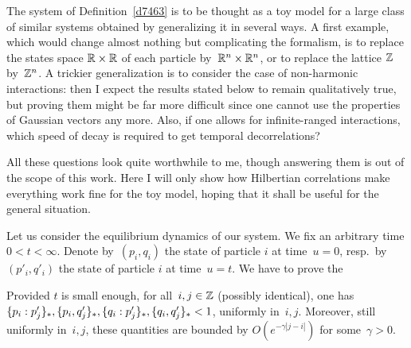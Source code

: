 \begin{Rmk}
The system of Definition~\ref{d7463} is to be thought
as a toy model for a large class of similar systems
obtained by generalizing it in several ways.
A first example, which would change almost nothing but complicating the formalism,
is to replace the states space
$\mathbb{R}\times\mathbb{R}$ of each particle by~$\mathbb{R}^n\times\mathbb{R}^n$,
or to replace the lattice $\mathbb{Z}$ by~$\mathbb{Z}^n$.
A trickier generalization is to consider the case of non-harmonic interactions:
then I expect the results stated below to remain qualitatively true,
but proving them might be far more difficult
since one cannot use the properties of Gaussian vectors any more.
Also, if one allows for infinite-ranged interactions, which speed of decay is required
to get temporal decorrelations?

All these questions look quite worthwhile to me, though answering them
is out of the scope of this work.
Here I will only show how Hilbertian correlations make everything work fine for the toy model,
hoping that it shall be useful for the general situation.
\end{Rmk}

Let us consider the equilibrium dynamics of our system.
We fix an arbitrary time $0 < t < \infty$.
Denote by~$(p_i,q_i)$ the state of particle $i$ at time~${u=0}$,
resp.\ by~$(p'_i,q'_i)$ the state of particle $i$ at time~${u=t}$.
We have to prove the
%
\begin{Clm}\label{lem1278}
Provided $t$ is small enough, for all~$i,j\in\mathbb{Z}$ (possibly identical),
one has ${\{p_i:p'_j\}_*}, \allowbreak {\{p_i,q'_j\}_*}, \allowbreak {\{q_i:p'_j\}_*}, \allowbreak 
{\{q_i,q'_j\}_*} < 1$, uniformly in~$i,j$.
Moreover, still uniformly in~$i,j$, these quantities are bounded by
$O(e^{-\gamma|j-i|})$ for some~$\gamma > 0$.
\end{Clm}

